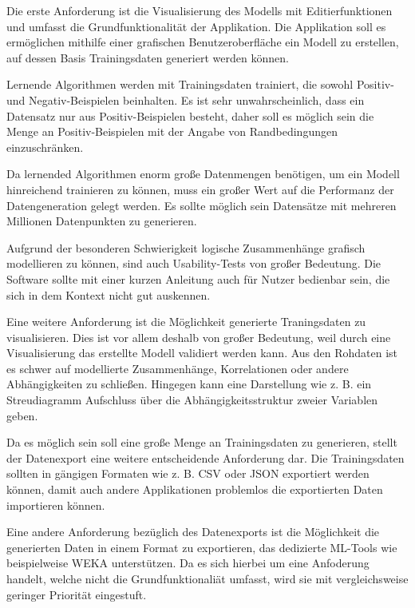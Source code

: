 Die erste Anforderung ist die Visualisierung des Modells mit Editierfunktionen und umfasst die Grundfunktionalität der Applikation. Die Applikation soll es ermöglichen mithilfe einer grafischen Benutzeroberfläche ein Modell zu erstellen, auf dessen Basis Trainingsdaten generiert werden können.

Lernende Algorithmen werden mit Trainingsdaten trainiert, die sowohl Positiv- und Negativ-Beispielen beinhalten. Es ist sehr unwahrscheinlich, dass ein Datensatz nur aus Positiv-Beispielen besteht, daher soll es möglich sein die Menge an Positiv-Beispielen mit der Angabe von Randbedingungen einzuschränken. 

Da lernended Algorithmen enorm große Datenmengen benötigen, um ein Modell hinreichend trainieren zu können, muss ein großer Wert auf die Performanz der Datengeneration gelegt werden. Es sollte möglich sein Datensätze mit mehreren Millionen Datenpunkten zu generieren.

Aufgrund der besonderen Schwierigkeit logische Zusammenhänge grafisch modellieren zu können, sind auch Usability-Tests von großer Bedeutung. Die Software sollte mit einer kurzen Anleitung auch für Nutzer bedienbar sein, die sich in dem Kontext nicht gut auskennen.

Eine weitere Anforderung ist die Möglichkeit generierte Traningsdaten zu visualisieren. Dies ist vor allem deshalb von großer Bedeutung, weil durch eine Visualisierung das erstellte Modell validiert werden kann. Aus den Rohdaten ist es schwer auf modellierte Zusammenhänge, Korrelationen oder andere Abhängigkeiten zu schließen. Hingegen kann eine Darstellung wie z. B. ein Streudiagramm Aufschluss über die Abhängigkeitsstruktur zweier Variablen geben.

Da es möglich sein soll eine große Menge an Trainingsdaten zu generieren, stellt der Datenexport eine weitere entscheidende Anforderung dar. Die Trainingsdaten sollten in gängigen Formaten wie z. B. CSV oder JSON exportiert werden können, damit auch andere Applikationen problemlos die exportierten Daten importieren können.

Eine andere Anforderung bezüglich des Datenexports ist die Möglichkeit die generierten Daten in einem Format zu exportieren, das dedizierte ML-Tools wie beispielweise WEKA unterstützen. Da es sich hierbei um eine Anfoderung handelt, welche nicht die Grundfunktionaliät umfasst, wird sie mit vergleichsweise geringer Priorität eingestuft.

